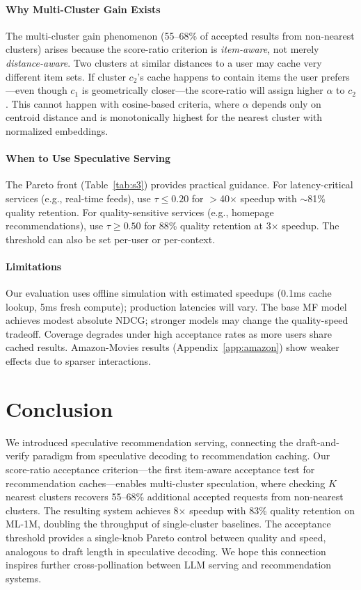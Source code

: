 \documentclass{article}
\begin{document}
\paragraph{Why Multi-Cluster Gain Exists}
The multi-cluster gain phenomenon (55--68\% of accepted results from non-nearest clusters) arises because the score-ratio criterion is \emph{item-aware}, not merely \emph{distance-aware}. Two clusters at similar distances to a user may cache very different item sets. If cluster $c_2$'s cache happens to contain items the user prefers---even though $c_1$ is geometrically closer---the score-ratio will assign higher $\alpha$ to $c_2$. This cannot happen with cosine-based criteria, where $\alpha$ depends only on centroid distance and is monotonically highest for the nearest cluster with normalized embeddings.

\paragraph{When to Use Speculative Serving}
The Pareto front (Table~\ref{tab:s3}) provides practical guidance. For latency-critical services (e.g., real-time feeds), use $\tau \leq 0.20$ for $>$40$\times$ speedup with $\sim$81\% quality retention. For quality-sensitive services (e.g., homepage recommendations), use $\tau \geq 0.50$ for 88\% quality retention at 3$\times$ speedup. The threshold can also be set per-user or per-context.

\paragraph{Limitations}
Our evaluation uses offline simulation with estimated speedups (0.1ms cache lookup, 5ms fresh compute); production latencies will vary. The base MF model achieves modest absolute NDCG; stronger models may change the quality-speed tradeoff. Coverage degrades under high acceptance rates as more users share cached results. Amazon-Movies results (Appendix~\ref{app:amazon}) show weaker effects due to sparser interactions.

\section{Conclusion}

We introduced speculative recommendation serving, connecting the draft-and-verify paradigm from speculative decoding to recommendation caching. Our score-ratio acceptance criterion---the first item-aware acceptance test for recommendation caches---enables multi-cluster speculation, where checking $K$ nearest clusters recovers 55--68\% additional accepted requests from non-nearest clusters. The resulting system achieves 8$\times$ speedup with 83\% quality retention on ML-1M, doubling the throughput of single-cluster baselines. The acceptance threshold provides a single-knob Pareto control between quality and speed, analogous to draft length in speculative decoding. We hope this connection inspires further cross-pollination between LLM serving and recommendation systems.
\end{document}
